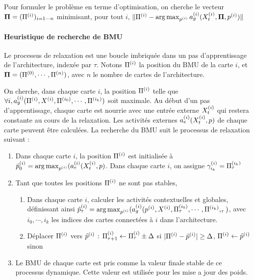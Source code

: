 Pour formuler le problème en terme d'optimisation, on cherche le vecteur $\mathbf{\Pi} = (\Pi^{({i})})_{i=1 \cdots n}$ minimisant, pour tout $i$, $\lVert \Pi^{({i})} - \operatorname*{arg\,max}_{p^{({i})}} a_g^{({i})}(X^{({i})}_t, \mathbf{\Pi}, p^{({i})}) \rVert$

\paragraph{Heuristique de recherche de BMU}
Le processus de relaxation est une boucle imbriquée dans un pas d'apprentissage de l'architecture, indexée par $\tau$. Notons $\Pi^{({i})}$ la position du BMU de la carte $i$, et $\mathbf{\Pi} = (\Pi^{({0})}, \cdots , \Pi^{({n})})$, avec $n$ le nombre de cartes de l'architecture.

On cherche, dans chaque carte $i$, la position $\Pi^{({i})}$ telle que $\forall i, a_g^{({i})}(\Pi^{({i})},X^{({i})},\Pi^{({i_0})},\cdots,\Pi^{({i_k})})$ soit maximale.
Au début d'un pas d'apprentissage, chaque carte est nourrie avec une entrée externe $X^{({i})}_t$ qui restera constante au cours de la relaxation. Les activités externes $a_e^{({i})}(X^{({i})}_t,p)$ de chaque carte peuvent être calculées.
La recherche du BMU suit le processus de relaxation suivant :
\begin{enumerate}
\item Dans chaque carte $i$, la position $\Pi^{({i})}$ est initialisée à $\hat{p}^{({i})}_0 = \operatorname*{arg\,max}_{p^{({i})}}(a_e^{({i})}(X^{({i})}_t,p)$. Dans chaque carte $i$, on assigne $\gamma_{i_k}^{({i})} = \Pi^{({i_k})}_\tau$
\item Tant que toutes les positions $\Pi^{({i})}$ ne sont pas stables, 
	\begin{enumerate}
	\item Dans chaque carte $i$, calculer les activités contextuelles et globales, définissant ainsi $\hat{p}^{({i})}_\tau = \operatorname*{arg\,max}_{p^{({i})}}(a_g^{({i})}(p^{({i})},X^{({i})}, \Pi^{({i_0})}_\tau,\cdots,\Pi^{({i_k})},_\tau)$, avec $i_0, \cdots, i_k$ les indices des cartes connectées à $i$ dans l'architecture.
	\item Déplacer $\Pi^{({i})}$ vers $\hat{p}^{({i})}$ : $\Pi^{({i})}_{\tau +1} \leftarrow \Pi^{({i})}_\tau \pm \Delta$ si $\lvert \Pi^{({i})}- \hat{p}^{({i})}\rvert \geq \Delta$, $\Pi^{({i})} \leftarrow \hat{p}^{({i})}$ sinon
	\end{enumerate}
\item Le BMU de chaque carte est pris comme la valeur finale stable de ce processus dynamique. Cette valeur est utilisée pour les mise a jour des poids.
\end{enumerate}

